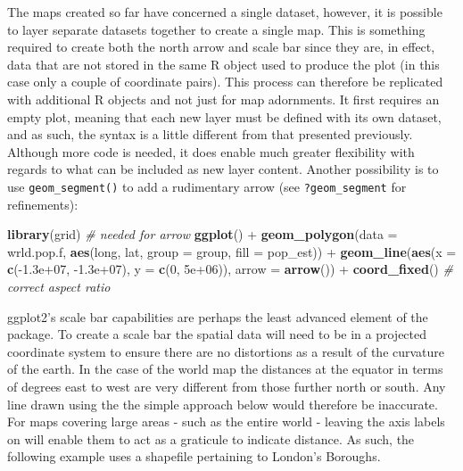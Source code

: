 \documentclass[]{article}
\newenvironment{Shaded}{}{}
\newcommand{\KeywordTok}[1]{\textcolor[rgb]{0.00,0.44,0.13}{\textbf{{#1}}}}
\newcommand{\DataTypeTok}[1]{\textcolor[rgb]{0.56,0.13,0.00}{{#1}}}
\newcommand{\DecValTok}[1]{\textcolor[rgb]{0.25,0.63,0.44}{{#1}}}
\newcommand{\FloatTok}[1]{\textcolor[rgb]{0.25,0.63,0.44}{{#1}}}
\newcommand{\CommentTok}[1]{\textcolor[rgb]{0.38,0.63,0.69}{\textit{{#1}}}}
\newcommand{\NormalTok}[1]{{#1}}
\begin{document}
The maps created so far have concerned a single dataset, however, it is possible to layer
separate datasets together to create a single map. This is something required to create both the north arrow and scale bar since they are, in effect, data that are not stored in the same R object used to produce the plot (in this case only a couple of coordinate pairs). This process can therefore be replicated with additional R objects and not just for map adornments. It first requires an empty plot, meaning that each new layer must be defined with
its own dataset, and as such, the syntax is a little different from that presented previously. Although more code is needed, it does enable
much greater flexibility with regards to what can be included as new
layer content. Another possibility is to use \texttt{geom\_segment()}
to add a rudimentary arrow (see \texttt{?geom\_segment} for
refinements):

\begin{Shaded}
\begin{Highlighting}[]
\KeywordTok{library}\NormalTok{(grid)  }\CommentTok{# needed for arrow}
\KeywordTok{ggplot}\NormalTok{() + }\KeywordTok{geom_polygon}\NormalTok{(}\DataTypeTok{data =} \NormalTok{wrld.pop.f, }\KeywordTok{aes}\NormalTok{(long, lat, }\DataTypeTok{group =} \NormalTok{group, }\DataTypeTok{fill =} \NormalTok{pop_est)) + }
    \KeywordTok{geom_line}\NormalTok{(}\KeywordTok{aes}\NormalTok{(}\DataTypeTok{x =} \KeywordTok{c}\NormalTok{(-}\FloatTok{1.3e+07}\NormalTok{, -}\FloatTok{1.3e+07}\NormalTok{), }\DataTypeTok{y =} \KeywordTok{c}\NormalTok{(}\DecValTok{0}\NormalTok{, }\FloatTok{5e+06}\NormalTok{)), }\DataTypeTok{arrow =} \KeywordTok{arrow}\NormalTok{()) + }
    \KeywordTok{coord_fixed}\NormalTok{()  }\CommentTok{# correct aspect ratio}
\end{Highlighting}
\end{Shaded}


ggplot2's scale bar capabilities are perhaps the least advanced element
of the package. To create a scale bar the spatial data will need to be in
a projected coordinate system to ensure there are no distortions as a
result of the curvature of the earth. In the case of the world map the
distances at the equator in terms of degrees east to west are very
different from those further north or south. Any line drawn using the
the simple approach below would therefore be inaccurate. For maps
covering large areas - such as the entire world - leaving the axis
labels on will enable them to act as a graticule to indicate distance.
As such, the following example uses a shapefile pertaining to London's
Boroughs.
\end{document}
